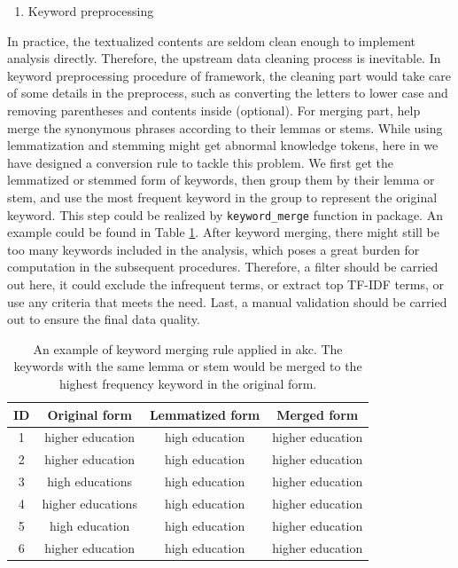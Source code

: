\begin{enumerate}
\def\labelenumi{(\arabic{enumi})}
\setcounter{enumi}{1}
\tightlist
\item
  Keyword preprocessing
\end{enumerate}

In practice, the textualized contents are seldom clean enough to
implement analysis directly. Therefore, the upstream data cleaning
process is inevitable. In keyword preprocessing procedure of
 framework, the cleaning part would take care of some
details in the preprocess, such as converting the letters to lower case
and removing parentheses and contents inside (optional). For merging
part,  help merge the synonymous phrases according to their
lemmas or stems. While using lemmatization and stemming might get
abnormal knowledge tokens, here in  we have designed a
conversion rule to tackle this problem. We first get the lemmatized or
stemmed form of keywords, then group them by their lemma or stem, and
use the most frequent keyword in the group to represent the original
keyword. This step could be realized by \texttt{keyword\_merge} function
in  package. An example could be found in Table
\ref{tab:tab1-2}. After keyword merging, there might still be too many
keywords included in the analysis, which poses a great burden for
computation in the subsequent procedures. Therefore, a filter should be
carried out here, it could exclude the infrequent terms, or extract top
TF-IDF terms, or use any criteria that meets the need. Last, a manual
validation should be carried out to ensure the final data quality.

\begin{Schunk}
\begin{table}

\caption{\label{tab:tab1-2}An example of keyword merging rule applied in akc. The keywords with the same lemma or stem would be merged to the highest frequency keyword in the original form.}
\centering
\fontsize{7}{9}\selectfont
\begin{tabular}[t]{c|c|c|c}
\hline
ID & Original form & Lemmatized form & Merged form\\
\hline
1 & higher education & high education & higher education\\
\hline
2 & higher education & high education & higher education\\
\hline
3 & high educations & high education & higher education\\
\hline
4 & higher educations & high education & higher education\\
\hline
5 & high education & high education & higher education\\
\hline
6 & higher education & high education & higher education\\
\hline
\end{tabular}
\end{table}

\end{Schunk}

